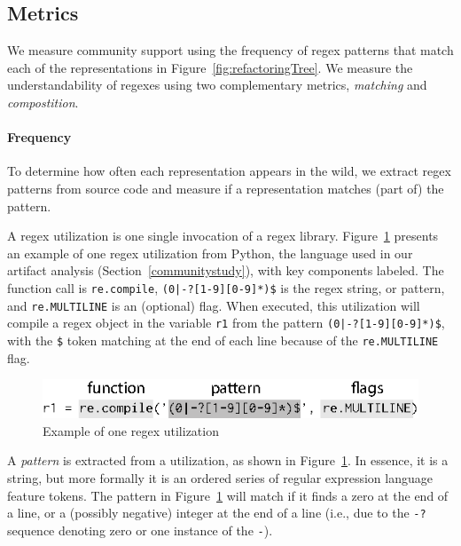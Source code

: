 \subsection{Metrics}
\label{sec:metric}
We measure community support using the frequency of regex patterns that match each of the representations in Figure~\ref{fig:refactoringTree}. We measure the understandability of regexes using two complementary metrics, \emph{matching} and \emph{compostition}.

\paragraph{Frequency}
To determine how often each representation appears in the wild, we extract regex patterns from source code and measure if a representation matches (part of) the pattern.

A regex {utilization} is one single invocation of a regex library.
Figure~\ref{fig:exampleUsage} presents an example of one regex {utilization} from Python, the language used in our artifact analysis (Section~\ref{communitystudy}), with key components labeled. The function call is {\tt re.compile}, \verb!(0|-?[1-9][0-9]*)$! is the regex string, or pattern, and {\tt re.MULTILINE} is an (optional) flag. When executed, this {utilization}  will compile a regex object in the variable {\tt r1} from the pattern \verb!(0|-?[1-9][0-9]*)$!, with the \verb!$! token matching at the end of each line because of the {\tt re.MULTILINE} flag.

\begin{figure}[tb]
\centering
\includegraphics[width=\columnwidth]{illustrations/exampleUsage.eps}
\vspace{-12pt}
\caption{Example of one regex utilization}
\vspace{-6pt}
\label{fig:exampleUsage}
\end{figure}

A \emph{pattern} is extracted from a utilization, as shown in Figure~\ref{fig:exampleUsage}. In essence, it is a string, but more formally it is an ordered series of regular expression language feature tokens.  The pattern in Figure~\ref{fig:exampleUsage}  will match if it finds a zero at the end of a line, or a (possibly negative) integer at the end of a line (i.e., due to the {\tt -?} sequence denoting zero or one instance of the {\tt -}).

